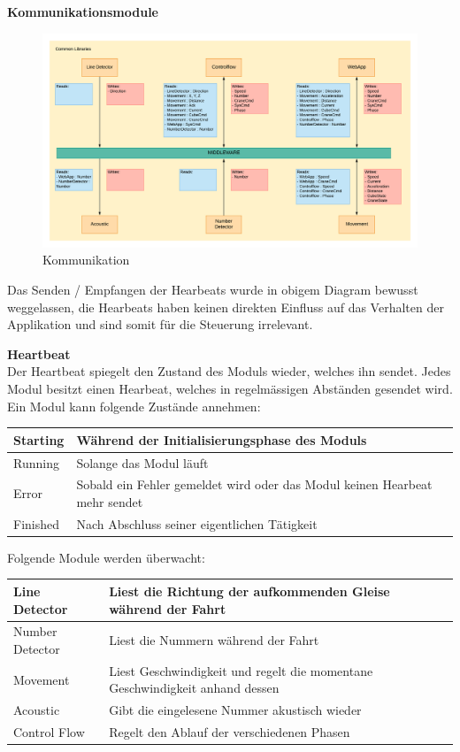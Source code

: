 \documentclass[../../main.tex]{subfiles}
\begin{document}
\pagebreak


\textbf{Kommunikationsmodule} \\
\begin{figure}[H] \centering
  \includegraphics[width=1\textwidth]{Architektur}
  \caption{Kommunikation}
  \label{fig:Kommunikation}
\end{figure}
Das Senden / Empfangen der Hearbeats wurde in obigem Diagram bewusst weggelassen, die Hearbeats haben keinen direkten Einfluss auf das Verhalten der Applikation und sind somit für die Steuerung irrelevant.

\textbf{Heartbeat} \\
Der Heartbeat spiegelt den Zustand des Moduls wieder, welches ihn sendet.
Jedes Modul besitzt einen Hearbeat, welches in regelmässigen Abständen gesendet wird. Ein Modul kann folgende Zustände annehmen:
\begin{table}[H]
    \begin{tabular}{ll}
    \hline
    Starting & Während der Initialisierungsphase des Moduls \\ \hline
    Running & Solange das Modul läuft\\ \hline
    Error & Sobald ein Fehler gemeldet wird oder das Modul keinen Hearbeat mehr sendet\\ \hline
    Finished & Nach Abschluss seiner eigentlichen Tätigkeit\\ \hline
    \end{tabular}
\end{table}
Folgende Module werden überwacht:
\begin{table}[H]
    \begin{tabular}{ll}
    \hline
    Line Detector & Liest die Richtung der aufkommenden Gleise während der Fahrt \\ \hline
    Number Detector & Liest die Nummern während der Fahrt\\ \hline
    Movement & Liest Geschwindigkeit und regelt die momentane Geschwindigkeit anhand dessen\\ \hline
    Acoustic & Gibt die eingelesene Nummer akustisch wieder\\ \hline
    Control Flow & Regelt den Ablauf der verschiedenen Phasen \\ \hline
    \end{tabular}
\end{table}
\end{document}
